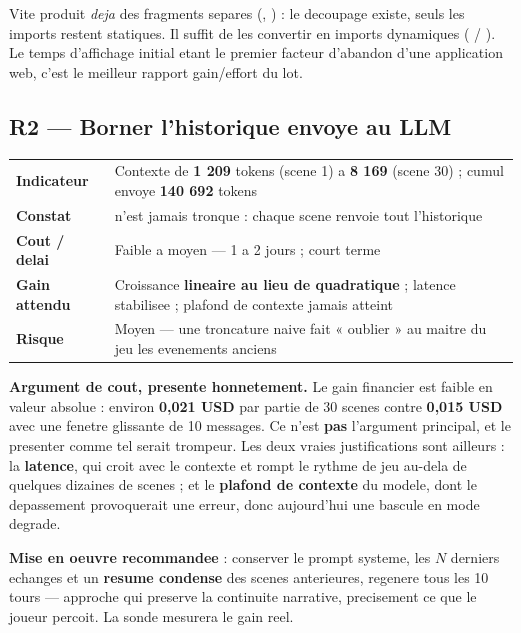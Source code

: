 \vspace{3pt}
Vite produit \emph{deja} des fragments separes (, ) :
le decoupage existe, seuls les imports restent statiques. Il suffit de les convertir en imports
dynamiques ( / ). Le temps d'affichage initial etant le premier
facteur d'abandon d'une application web, c'est le meilleur rapport gain/effort du lot.

\subsection{R2 --- Borner l'historique envoye au LLM}

\footnotesize
\begin{tabularx}{\linewidth}{@{}L{2.5cm} X@{}}
\toprule
\textbf{Indicateur} & Contexte de \textbf{1 209} tokens (scene 1) a \textbf{8 169} (scene 30) ; cumul envoye \textbf{140 692} tokens \\
\textbf{Constat} &  n'est jamais tronque : chaque scene renvoie tout l'historique \\
\textbf{Cout / delai} & \textcolor{OrangeAlerte}{Faible a moyen} --- 1 a 2 jours ; court terme \\
\textbf{Gain attendu} & Croissance \textbf{lineaire au lieu de quadratique} ; latence stabilisee ; plafond de contexte jamais atteint \\
\textbf{Risque} & \textcolor{OrangeAlerte}{Moyen} --- une troncature naive fait « oublier » au maitre du jeu les evenements anciens \\
\bottomrule
\end{tabularx}
\normalsize

\vspace{3pt}
\textbf{Argument de cout, presente honnetement.} Le gain financier est faible en valeur absolue :
environ \textbf{0,021 USD} par partie de 30 scenes contre \textbf{0,015 USD} avec une fenetre
glissante de 10 messages. Ce n'est \textbf{pas} l'argument principal, et le presenter comme tel
serait trompeur. Les deux vraies justifications sont ailleurs : la \textbf{latence}, qui croit avec
le contexte et rompt le rythme de jeu au-dela de quelques dizaines de scenes ; et le \textbf{plafond
de contexte} du modele, dont le depassement provoquerait une erreur, donc aujourd'hui une bascule
en mode degrade.

\textbf{Mise en oeuvre recommandee} : conserver le prompt systeme, les $N$ derniers echanges et un
\textbf{resume condense} des scenes anterieures, regenere tous les 10 tours --- approche qui
preserve la continuite narrative, precisement ce que le joueur percoit. La sonde
 mesurera le gain reel.

